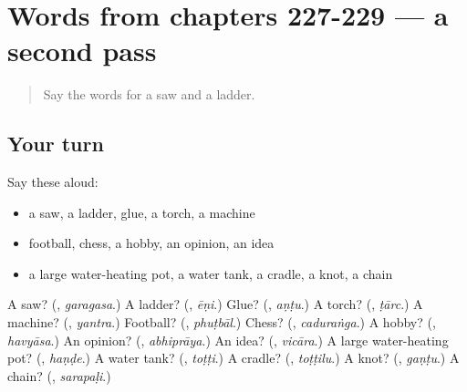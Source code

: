 \section[(dialogue)]{Words from chapters 227-229 — a second pass}

\label{lesson:KA-R229-second-pass-words-from-chapters-227-229}



\begin{quote}
Say the words for a saw and a ladder.
\end{quote}

\subsection*{Your turn}
Say these aloud:

\begin{itemize}
\raggedright
  \item a saw, a ladder, glue, a torch, a machine
  \item football, chess, a hobby, an opinion, an idea
  \item a large water-heating pot, a water tank, a cradle, a knot, a chain
\end{itemize}

\begin{tcolorbox}[breakable,colback=teal!4,colframe=teal!35!black,title={Before you move on}]
A saw? (\textbf{}, \emph{garagasa}.) A ladder? (\textbf{}, \emph{ēṇi}.) Glue? (\textbf{}, \emph{aṇṭu}.) A torch? (\textbf{}, \emph{ṭārc}.) A machine? (\textbf{}, \emph{yantra}.) Football? (\textbf{}, \emph{phuṭbāl}.) Chess? (\textbf{}, \emph{caduraṅga}.) A hobby? (\textbf{}, \emph{havyāsa}.) An opinion? (\textbf{}, \emph{abhiprāya}.) An idea? (\textbf{}, \emph{vicāra}.) A large water-heating pot? (\textbf{}, \emph{haṇḍe}.) A water tank? (\textbf{}, \emph{toṭṭi}.) A cradle? (\textbf{}, \emph{toṭṭilu}.) A knot? (\textbf{}, \emph{gaṇṭu}.) A chain? (\textbf{}, \emph{sarapaḷi}.)
\end{tcolorbox}
